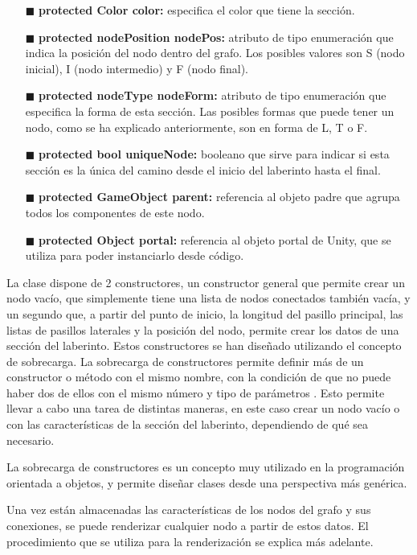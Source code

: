 \documentclass[../main.tex]{subfiles}
\begin{document}
\begin{itemize}
    \item[$\blacksquare$] \textbf{protected Color color:} especifica el color que tiene la sección.
    \item[$\blacksquare$] \textbf{protected nodePosition nodePos:} atributo de tipo enumeración que indica la posición del nodo dentro del grafo. Los posibles valores son S (nodo inicial), I (nodo intermedio) y F (nodo final).
    \item[$\blacksquare$] \textbf{protected nodeType nodeForm:} atributo de tipo enumeración que especifica la forma de esta sección. Las posibles formas que puede tener un nodo, como se ha explicado anteriormente, son en forma de L, T o F.
    \item[$\blacksquare$] \textbf{protected bool uniqueNode:} booleano que sirve para indicar si esta sección es la única del camino desde el inicio del laberinto hasta el final.
    \item[$\blacksquare$] \textbf{protected GameObject parent:} referencia al objeto padre que agrupa todos los componentes de este nodo.
    \item[$\blacksquare$] \textbf{protected Object portal:} referencia al objeto portal de Unity, que se utiliza para poder instanciarlo desde código.
\end{itemize}

La clase dispone de 2 constructores, un constructor general que permite crear un nodo vacío, que simplemente tiene una lista de nodos conectados también vacía, y un segundo que, a partir del punto de inicio, la longitud del pasillo principal, las listas de pasillos laterales y la posición del nodo, permite crear los datos de una sección del laberinto. Estos constructores se han diseñado utilizando el concepto de sobrecarga. La sobrecarga de constructores permite definir más de un constructor o método con el mismo nombre, con la condición de que no puede haber dos de ellos con el mismo número y tipo de parámetros \cite{Sobrecarga_Constructores}. Esto permite llevar a cabo una tarea de distintas maneras, en este caso crear un nodo vacío o con las características de la sección del laberinto, dependiendo de qué sea necesario.

La sobrecarga de constructores es un concepto muy utilizado en la programación orientada a objetos, y permite diseñar clases desde una perspectiva más genérica.

Una vez están almacenadas las características de los nodos del grafo y sus conexiones, se puede renderizar cualquier nodo a partir de estos datos. El procedimiento que se utiliza para la renderización se explica más adelante.
\end{document}
